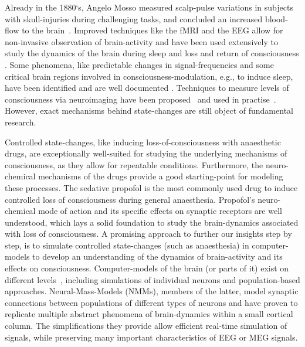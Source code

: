 Already in the 1880`s, Angelo Mosso measured scalp-pulse variations in subjects
with skull-injuries during challenging tasks,
and concluded an increased blood-flow to the brain~\cite{mosso_ueber_1881}.
Improved techniques like the fMRI and the EEG allow for non-invasive observation of brain-activity and have been
used extensively to study the dynamics of the brain during sleep and loss and return of consciousness
\citationneeded.
Some phenomena, like predictable changes in signal-frequencies and some critical brain regions involved in
consciousness-modulation, e.g., to induce sleep, have been identified and are well documented
\citationneeded.
Techniques to measure levels of consciousness via neuroimaging have been proposed~\cite{sigl_introduction_1994,
    casali_theoretically_2013} and used in practise~\cite{mathur_bispectral_2022}.
However, exact mechanisms behind state-changes are still object of fundamental research.

Controlled state-changes, like inducing loss-of-consciousness with anaesthetic drugs,
are exceptionally well-suited for studying the underlying mechanisms of consciousness,
as they allow for repeatable conditions.
Furthermore, the neuro-chemical mechanisms of the drugs provide a good starting-point for modeling these processes.
The sedative propofol is the most commonly used drug to induce controlled loss of consciousness
during general anaesthesia.
Propofol's neuro-chemical mode of action and its specific effects on synaptic receptors are well understood,
which lays a solid foundation to study the brain-dynamics associated with loss of consciousness.
A promising approach to further our insights step by step, is to simulate controlled state-changes
(such as anaesthesia) in computer-models to develop an understanding of the dynamics of brain-activity and its
effects on consciousness. %
Computer-models of the brain (or parts of it) exist on different levels~\cite{panahi_generative_2021},
including simulations of individual neurons and population-based approaches.
Neural-Mass-Models (NMMs), members of the latter, model synaptic connections between populations of different types
of neurons and have proven to replicate multiple abstract phenomena of brain-dynamics\cite{bojak_neural_2014,
    knösche_jansen-rit_2014} within a small cortical
column.
The simplifications they provide allow efficient real-time simulation of signals,
while preserving many important characteristics of EEG or MEG signals.

